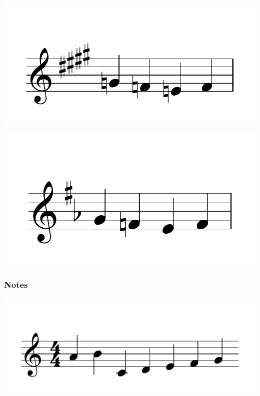 \documentclass{article}
\begin{document}
\includegraphics[scale=0.5]{figures_tests/pdf/skern/keysignature2.pdf}

\includegraphics[scale=0.5]{figures_tests/pdf/skern/keysignature3.pdf}

\subsubsection{Notes}
\includegraphics[scale=0.5]{figures_tests/pdf/skern/notename.pdf}
\end{document}
